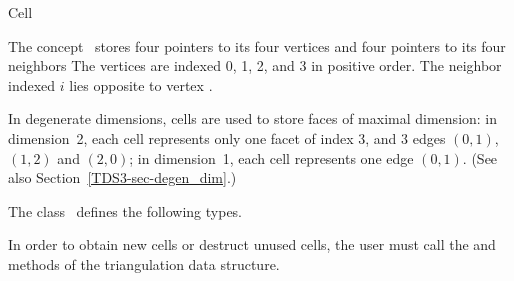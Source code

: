 

\begin{ccRefConcept}[TriangulationDataStructure_3::]{Cell}


\ccDefinition
  
The concept \ccRefName\ stores
four pointers to its four vertices and four pointers to its four
neighbors The vertices are indexed 0, 1, 2, and 3 in positive order.
The neighbor indexed $i$ lies opposite to vertex .

In degenerate dimensions, cells are used to store faces of maximal
dimension: in dimension~2, each cell represents only one
facet of index 3, and 3 edges $(0,1)$, $(1,2)$ and $(2,0)$; in
dimension~1, each cell represents one edge $(0,1)$. (See also
Section~\ref{TDS3-sec-degen_dim}.) 

\ccTypes
{}
\ccThreeToTwo
The class \ccClassName\ defines the following types.

\ccGlue
{}

\ccCreation
{}  %

In order to obtain new cells or destruct unused cells, the user must call the
 and  methods of the triangulation data
structure.





\end{ccRefConcept}
